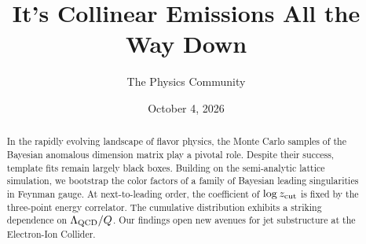 \documentclass[11pt]{article}
\title{It's Collinear Emissions All the Way Down}
\author{The Physics Community}
\date{October 4, 2026}
\begin{document}
\maketitle
\begin{abstract}
In the rapidly evolving landscape of flavor physics, the Monte Carlo
samples of the Bayesian anomalous dimension matrix play a pivotal role.
Despite their success, template fits remain largely black boxes.
Building on the semi-analytic lattice simulation, we bootstrap the color
factors of a family of Bayesian leading singularities in Feynman gauge.
At next-to-leading order, the coefficient of $\log z_{\rm cut}$ is fixed
by the three-point energy correlator. The cumulative distribution
exhibits a striking dependence on $\Lambda_{\rm QCD}/Q$. Our findings
open new avenues for jet substructure at the Electron-Ion Collider.
\end{abstract}
\tableofcontents





\nocite{*}


\end{document}
